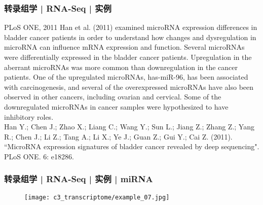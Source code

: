 \begin{frame}
  \frametitle{转录组学 | RNA-Seq | 实例}
  \begin{block}{PLoS ONE, 2011}
  Han et al. (2011) examined microRNA expression differences in bladder cancer patients in order to understand how changes and dysregulation in microRNA can influence mRNA expression and function. Several microRNAs were differentially expressed in the bladder cancer patients. Upregulation in the aberrant microRNAs was more common than downregulation in the cancer patients. One of the upregulated microRNAs, has-miR-96, has been associated with carcinogenesis, and several of the overexpressed microRNAs have also been observed in other cancers, including ovarian and cervical. Some of the downregulated microRNAs in cancer samples were hypothesized to have inhibitory roles.\\
  \vspace{0.5em}
Han Y.; Chen J.; Zhao X.; Liang C.; Wang Y.; Sun L.; Jiang Z.; Zhang Z.; Yang R.; Chen J.; Li Z.; Tang A.; Li X.; Ye J.; Guan Z.; Gui Y.; Cai Z. (2011). ``MicroRNA expression signatures of bladder cancer revealed by deep sequencing". PLoS ONE. 6: e18286. 
  \end{block}
\end{frame}

\begin{frame}
  \frametitle{转录组学 | RNA-Seq | 实例 | miRNA}
  \begin{figure}
    \centering
    \texttt{[image: c3\_transcriptome/example\_07.jpg]}
  \end{figure}
\end{frame}
